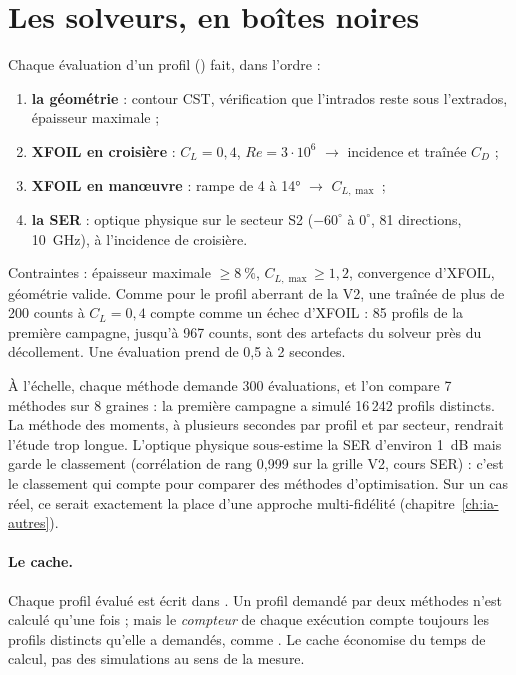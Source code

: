 \section{Les solveurs, en boîtes noires}
Chaque évaluation d'un profil () fait, dans l'ordre :
\begin{enumerate}
\item \textbf{la géométrie} : contour CST, vérification que l'intrados reste sous l'extrados, épaisseur maximale ;
\item \textbf{XFOIL en croisière} : $C_L=0{,}4$, $Re=3\cdot10^6$ $\to$ incidence et traînée $C_D$ ;
\item \textbf{XFOIL en manœuvre} : rampe de 4 à 14° $\to$ $C_{L,\max}$ ;
\item \textbf{la SER} : optique physique sur le secteur S2 ($-60^\circ$ à $0^\circ$, 81 directions, 10~GHz), à l'incidence de croisière.
\end{enumerate}
Contraintes : épaisseur maximale $\ge8~\%$, $C_{L,\max}\ge1{,}2$, convergence d'XFOIL, géométrie valide. Comme pour le profil aberrant de la V2, une traînée de plus de 200 counts à $C_L=0{,}4$ compte comme un échec d'XFOIL : 85 profils de la première campagne, jusqu'à 967 counts, sont des artefacts du solveur près du décollement. Une évaluation prend de 0,5 à 2 secondes.

\begin{piege}
À l'échelle, chaque méthode demande 300 évaluations, et l'on compare 7 méthodes sur 8 graines : la première campagne a simulé 16\,242 profils distincts. La méthode des moments, à plusieurs secondes par profil et par secteur, rendrait l'étude trop longue. L'optique physique sous-estime la SER d'environ 1~dB mais garde le classement (corrélation de rang 0,999 sur la grille V2, cours SER) : c'est le classement qui compte pour comparer des méthodes d'optimisation. Sur un cas réel, ce serait exactement la place d'une approche multi-fidélité (chapitre~\ref{ch:ia-autres}).
\end{piege}

\paragraph{Le cache.} Chaque profil évalué est écrit dans . Un profil demandé par deux méthodes n'est calculé qu'une fois ; mais le \emph{compteur} de chaque exécution compte toujours les profils distincts qu'elle a demandés, comme . Le cache économise du temps de calcul, pas des simulations au sens de la mesure.

